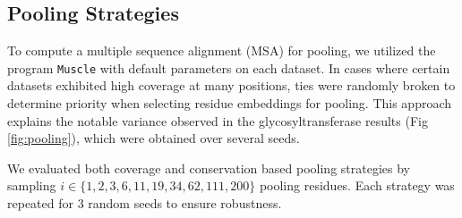 \subsection{Pooling Strategies}

To compute a multiple sequence alignment (MSA) for pooling, we utilized the program \texttt{Muscle} with default parameters on each dataset. In cases where certain datasets exhibited high coverage at many positions, ties were randomly broken to determine priority when selecting residue embeddings for pooling. This approach explains the notable variance observed in the glycosyltransferase results (Fig \ref{fig:pooling}), which were obtained over several seeds.

We evaluated both coverage and conservation based pooling strategies by sampling $i \in \{1,2,3,6,11,19,34,62,111,200\}$ pooling residues. Each strategy was repeated for 3 random seeds to ensure robustness.